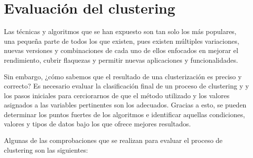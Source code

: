 \documentclass[10pt, a4paper]{article}
\begin{document}


\section{Evaluación del clustering} \label{sec:Evaluación del clustering}

Las técnicas y algoritmos que se han expuesto son tan solo los más populares, una pequeña parte de todos los que existen, pues existen múltiples variaciones, nuevas versiones y combinaciones de cada uno de ellos enfocados en mejorar el rendimiento, cubrir flaquezas y permitir nuevas aplicaciones y funcionalidades.

Sin embargo, ¿cómo sabemos que el resultado de una clusterización es preciso y correcto?  Es necesario evaluar la clasificación final de un proceso de clustering y y los pasos iniciales para cerciorarnos de que el método utilizado y los valores asignados a las variables pertinentes son los adecuados. Gracias a esto, se pueden determinar los puntos fuertes de los algoritmos e identificar aquellas condiciones, valores y tipos de datos bajo los que ofrece mejores resultados.

Algunas de las comprobaciones que se realizan para evaluar el proceso de clustering son las siguientes:
\end{document}
